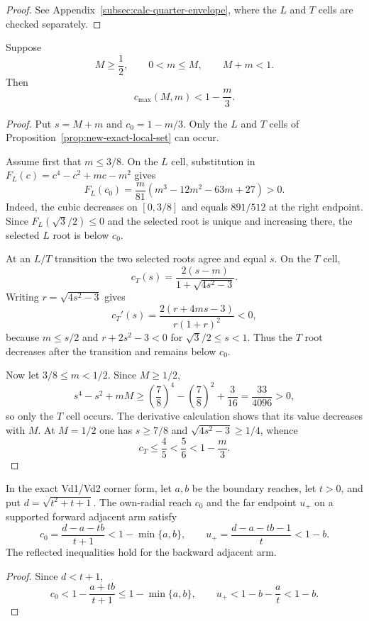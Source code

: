 \begin{proof}
See Appendix~\ref{subsec:calc-quarter-envelope}, where the $L$ and $T$ cells
are checked separately.
\end{proof}

\begin{lemma}
\label{lem:new-one-third-radial-envelope}
Suppose
\[
 M\ge\frac12,\qquad 0<m\le M,\qquad M+m<1.
\]
Then
\[
 \boxed{c_{\max}(M,m)<1-\frac m3.}
 \tag{6.70}
\]
\end{lemma}

\begin{proof}
Put $s=M+m$ and $c_0=1-m/3$.  Only the $L$ and $T$ cells of
Proposition~\ref{prop:new-exact-local-set} can occur.

Assume first that $m\le3/8$.  On the $L$ cell, substitution in
$F_L(c)=c^4-c^2+mc-m^2$ gives
\[
 F_L(c_0)=
 \frac m{81}(m^3-12m^2-63m+27)>0.
\]
Indeed, the cubic decreases on $[0,3/8]$ and equals $891/512$ at the right
endpoint.  Since $F_L(\sqrt3/2)\le0$ and the selected root is unique and
increasing there, the selected $L$ root is below $c_0$.

At an $L/T$ transition the two selected roots agree and equal $s$.  On the
$T$ cell,
\[
 c_T(s)=\frac{2(s-m)}{1+\sqrt{4s^2-3}}.
\]
Writing $r=\sqrt{4s^2-3}$ gives
\[
 c_T'(s)=\frac{2(r+4ms-3)}{r(1+r)^2}<0,
\]
because $m\le s/2$ and $r+2s^2-3<0$ for $\sqrt3/2\le s<1$.
Thus the $T$ root decreases after the transition and remains below $c_0$.

Now let $3/8\le m<1/2$.  Since $M\ge1/2$,
\[
 s^4-s^2+mM
 \ge
 \left(\frac78\right)^4-\left(\frac78\right)^2+\frac3{16}
 =\frac{33}{4096}>0,
\]
so only the $T$ cell occurs.  The derivative calculation shows that its value
decreases with $M$.  At $M=1/2$ one has $s\ge7/8$ and
$\sqrt{4s^2-3}\ge1/4$, whence
\[
 c_T\le\frac45<\frac56<1-\frac m3.
\]
\end{proof}

\begin{lemma}
\label{lem:readable-vd-corner-margins}
In the exact Vd1/Vd2 corner form, let $a,b$ be the boundary reaches, let
$t>0$, and put $d=\sqrt{t^2+t+1}$.  The own-radial reach $c_0$ and the far
endpoint $u_+$ on a supported forward adjacent arm satisfy
\[
 c_0=\frac{d-a-tb}{t+1}<1-\min\{a,b\},
 \qquad
 u_+=\frac{d-a-tb-1}{t}<1-b.
\]
The reflected inequalities hold for the backward adjacent arm.
\end{lemma}

\begin{proof}
Since $d<t+1$,
\[
 c_0<1-\frac{a+tb}{t+1}\le1-\min\{a,b\},
 \qquad
 u_+<1-b-\frac at<1-b.
\]
\end{proof}
